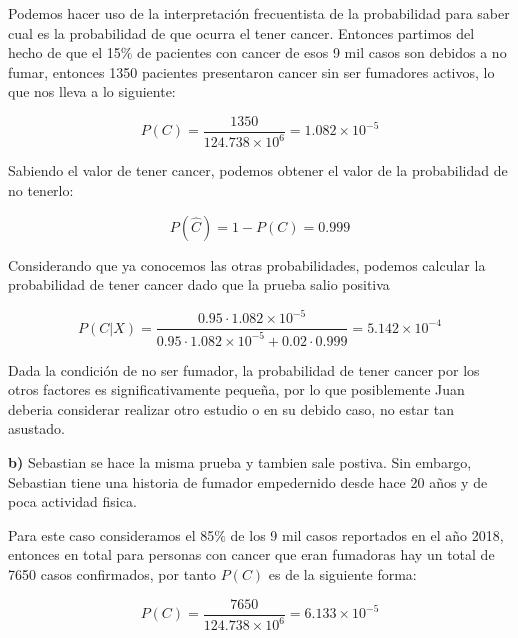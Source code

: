 \documentclass{article}
\begin{document}
\vspace{10pt}

Podemos hacer uso de la interpretación frecuentista de la probabilidad para saber cual es la probabilidad de que ocurra el tener cancer. Entonces partimos del hecho de que el 15$\%$ de pacientes con cancer de esos 9 mil casos son debidos a no fumar, entonces 1350 pacientes presentaron cancer sin ser fumadores activos, lo que nos lleva a lo siguiente:


\begin{equation}
    P(C) = \frac{1350}{124.738 \times 10^{6}} = 1.082 \times 10^{-5}
\end{equation}



Sabiendo el valor de tener cancer, podemos obtener el valor de la probabilidad de no tenerlo: 


\begin{equation}
    P(\hat{C}) = 1 - P(C) = 0.999 
\end{equation}


Considerando que ya conocemos las otras probabilidades, podemos calcular la probabilidad de tener cancer dado que la prueba salio positiva 


\begin{equation}
    P(C|X) = \frac{0.95 \cdot 1.082 \times 10^{-5}}{0.95 \cdot 1.082 \times 10^{-5} + 0.02 \cdot 0.999 } = 5.142 \times 10^{-4}
\end{equation}

Dada la condición de no ser fumador, la probabilidad de tener cancer por los otros factores es significativamente pequeña, por lo que posiblemente Juan deberia considerar realizar otro estudio o en su debido caso, no estar tan asustado.


\vspace{10pt}



\textbf{b)} Sebastian se hace la misma prueba y tambien sale postiva. Sin embargo, Sebastian tiene una historia de fumador empedernido desde hace 20 años y de poca actividad fisica. 

\vspace{10pt}


Para este caso consideramos el 85$\%$ de los 9 mil casos reportados en el año 2018, entonces en total para personas con cancer que eran fumadoras hay un total de 7650 casos confirmados, por tanto $P(C)$ es de la siguiente forma:


\begin{equation}
    P(C) = \frac{7650}{124.738 \times 10^{6}} = 6.133 \times 10^{-5} 
\end{equation}
\end{document}
